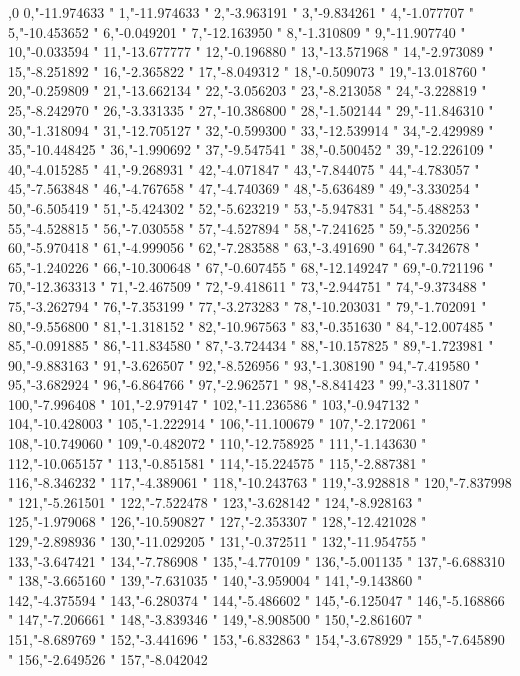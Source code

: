 ,0
0,"-11.974633
"
1,"-11.974633
"
2,"-3.963191
"
3,"-9.834261
"
4,"-1.077707
"
5,"-10.453652
"
6,"-0.049201
"
7,"-12.163950
"
8,"-1.310809
"
9,"-11.907740
"
10,"-0.033594
"
11,"-13.677777
"
12,"-0.196880
"
13,"-13.571968
"
14,"-2.973089
"
15,"-8.251892
"
16,"-2.365822
"
17,"-8.049312
"
18,"-0.509073
"
19,"-13.018760
"
20,"-0.259809
"
21,"-13.662134
"
22,"-3.056203
"
23,"-8.213058
"
24,"-3.228819
"
25,"-8.242970
"
26,"-3.331335
"
27,"-10.386800
"
28,"-1.502144
"
29,"-11.846310
"
30,"-1.318094
"
31,"-12.705127
"
32,"-0.599300
"
33,"-12.539914
"
34,"-2.429989
"
35,"-10.448425
"
36,"-1.990692
"
37,"-9.547541
"
38,"-0.500452
"
39,"-12.226109
"
40,"-4.015285
"
41,"-9.268931
"
42,"-4.071847
"
43,"-7.844075
"
44,"-4.783057
"
45,"-7.563848
"
46,"-4.767658
"
47,"-4.740369
"
48,"-5.636489
"
49,"-3.330254
"
50,"-6.505419
"
51,"-5.424302
"
52,"-5.623219
"
53,"-5.947831
"
54,"-5.488253
"
55,"-4.528815
"
56,"-7.030558
"
57,"-4.527894
"
58,"-7.241625
"
59,"-5.320256
"
60,"-5.970418
"
61,"-4.999056
"
62,"-7.283588
"
63,"-3.491690
"
64,"-7.342678
"
65,"-1.240226
"
66,"-10.300648
"
67,"-0.607455
"
68,"-12.149247
"
69,"-0.721196
"
70,"-12.363313
"
71,"-2.467509
"
72,"-9.418611
"
73,"-2.944751
"
74,"-9.373488
"
75,"-3.262794
"
76,"-7.353199
"
77,"-3.273283
"
78,"-10.203031
"
79,"-1.702091
"
80,"-9.556800
"
81,"-1.318152
"
82,"-10.967563
"
83,"-0.351630
"
84,"-12.007485
"
85,"-0.091885
"
86,"-11.834580
"
87,"-3.724434
"
88,"-10.157825
"
89,"-1.723981
"
90,"-9.883163
"
91,"-3.626507
"
92,"-8.526956
"
93,"-1.308190
"
94,"-7.419580
"
95,"-3.682924
"
96,"-6.864766
"
97,"-2.962571
"
98,"-8.841423
"
99,"-3.311807
"
100,"-7.996408
"
101,"-2.979147
"
102,"-11.236586
"
103,"-0.947132
"
104,"-10.428003
"
105,"-1.222914
"
106,"-11.100679
"
107,"-2.172061
"
108,"-10.749060
"
109,"-0.482072
"
110,"-12.758925
"
111,"-1.143630
"
112,"-10.065157
"
113,"-0.851581
"
114,"-15.224575
"
115,"-2.887381
"
116,"-8.346232
"
117,"-4.389061
"
118,"-10.243763
"
119,"-3.928818
"
120,"-7.837998
"
121,"-5.261501
"
122,"-7.522478
"
123,"-3.628142
"
124,"-8.928163
"
125,"-1.979068
"
126,"-10.590827
"
127,"-2.353307
"
128,"-12.421028
"
129,"-2.898936
"
130,"-11.029205
"
131,"-0.372511
"
132,"-11.954755
"
133,"-3.647421
"
134,"-7.786908
"
135,"-4.770109
"
136,"-5.001135
"
137,"-6.688310
"
138,"-3.665160
"
139,"-7.631035
"
140,"-3.959004
"
141,"-9.143860
"
142,"-4.375594
"
143,"-6.280374
"
144,"-5.486602
"
145,"-6.125047
"
146,"-5.168866
"
147,"-7.206661
"
148,"-3.839346
"
149,"-8.908500
"
150,"-2.861607
"
151,"-8.689769
"
152,"-3.441696
"
153,"-6.832863
"
154,"-3.678929
"
155,"-7.645890
"
156,"-2.649526
"
157,"-8.042042
